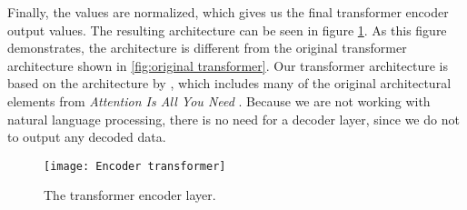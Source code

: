Finally, the values are normalized, which gives us the final transformer encoder output values.
The resulting architecture can be seen in figure \ref{fig:encoder transformer}.
As this figure demonstrates, the architecture is different from the original transformer architecture shown in \ref{fig:original transformer}.
Our transformer architecture is based on the architecture by \citet{schmitz_stock_2020}, which includes many of the original architectural elements from \textit{Attention Is All You Need} \cite{AttentionIsAllYouNeed}.
Because we are not working with natural language processing, there is no need for a decoder layer, since we do not to output any decoded data. 

\begin{figure}[h]
\centering
\texttt{[image: Encoder transformer]}
\caption{The transformer encoder layer.}
\label{fig:encoder transformer}
\end{figure}